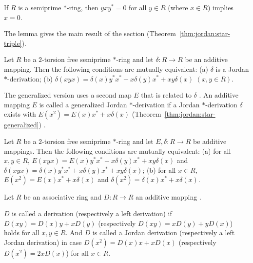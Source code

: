 \begin{lemma}\label{lem:jordan:star-semiprime}
If $R$ is a semiprime $\ast$-ring, then $yxy^{\ast}=0$ for all $y\in R$ (where $x\in R$) implies
$x=0$.
\end{lemma}

The lemma gives the main result of the section
(Theorem~\ref{thm:jordan:star-triple}).

\begin{theorem}\label{thm:jordan:star-triple}
Let $R$ be a $2$-torsion free semiprime $\ast$-ring and let $\delta\colon R\to R$ be an additive
mapping. Then the following conditions are mutually equivalent:
(a) $\delta$ is a Jordan $\ast$-derivation;
(b) $\delta(xyx)=\delta(x)y^{\ast}x^{\ast}+x\delta(y)x^{\ast}+xy\delta(x)$ $(x,y\in R)$.
\end{theorem}

The generalized version uses a second map $E$ that is related to $\delta$
\cite[p.~417]{FosnerIlisevic2008}. An additive mapping $E$ is called a generalized Jordan
$\ast$-derivation if a Jordan $\ast$-derivation $\delta$ exists with $E(x^{2})=E(x)x^{\ast}+x\delta(x)$ (Theorem~\ref{thm:jordan:star-generalized})
\cite[p.~417]{FosnerIlisevic2008}.\begin{theorem}\label{thm:jordan:star-generalized}
Let $R$ be a $2$-torsion free semiprime $\ast$-ring and let $E,\delta\colon R\to R$ be additive
mappings. Then the following conditions are mutually equivalent:
(a) for all $x,y\in R$, $E(xyx)=E(x)y^{\ast}x^{\ast}+x\delta(y)x^{\ast}+xy\delta(x)$ and
$\delta(xyx)=\delta(x)y^{\ast}x^{\ast}+x\delta(y)x^{\ast}+xy\delta(x)$;
(b) for all $x\in R$, $E(x^{2})=E(x)x^{\ast}+x\delta(x)$ and
$\delta(x^{2})=\delta(x)x^{\ast}+x\delta(x)$.
\end{theorem}

Let $R$ be an associative ring and $D\colon R\to R$ an
additive mapping \cite[p.~1]{Vukman1997}.

\begin{definition}\label{def:jordan:left}
$D$ is called a derivation (respectively a left derivation) if $D(xy)=D(x)y+xD(y)$ (respectively
$D(xy)=xD(y)+yD(x)$) holds for all $x,y\in R$. And $D$ is called a Jordan derivation (respectively a left
Jordan derivation) in case $D(x^{2})=D(x)x+xD(x)$ (respectively $D(x^{2})=2xD(x)$) for all $x\in R$.
\end{definition}


